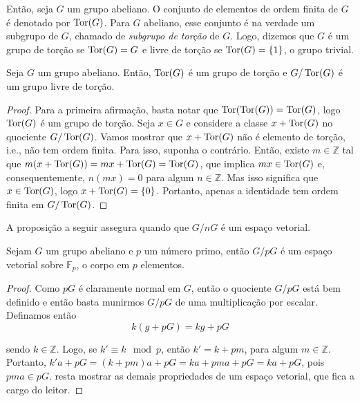 	\par\vspace{0.3cm} Então, seja $G$ um grupo abeliano. O conjunto de elementos de ordem finita de $G$ é denotado por $\operatorname{Tor}(G)$. Para $G$ abeliano, esse conjunto é na verdade um subgrupo de $G$, chamado de \textit{subgrupo de torção} de $G$. Logo, dizemos que $G$ é um grupo de torção se $\operatorname{Tor}(G) = G$ e livre de torção se $\operatorname{Tor}(G) = \left\{1\right\}$, o grupo trivial.
	\begin{lemma}
		\label{quociente por tor}
		Seja $G$ um grupo abeliano. Então, $\operatorname{Tor}(G)$ é um grupo de torção e $G/\operatorname{Tor}(G)$ é um grupo livre de torção.
	\end{lemma}
	\begin{proof}
		Para a primeira afirmação, basta notar que $\operatorname{Tor}(\operatorname{Tor}(G)) = \operatorname{Tor}(G)$, logo $\operatorname{Tor}(G)$ é um grupo de torção. Seja $x\in G$ e considere a classe $x + \operatorname{Tor}(G)$ no quociente $G/\operatorname{Tor}(G)$. Vamos mostrar que $x + \operatorname{Tor}(G)$ não é elemento de torção, i.e., não tem ordem finita. Para isso, suponha o contrário. Então, existe $m\in\mathbb{Z}$ tal que $m( x+\operatorname{Tor}(G) ) = mx + \operatorname{Tor}(G) = \operatorname{Tor}(G)$, que implica $mx\in\operatorname{Tor}(G)$ e, consequentemente, $n(mx) = 0$ para algum $n\in\mathbb{Z}$. Mas isso significa que $x\in\operatorname{Tor}(G)$, logo $x+\operatorname{Tor}(G) = \left\{0\right\}$. Portanto, apenas a identidade tem ordem finita em $G/\operatorname{Tor}(G)$. 
	\end{proof}
	\par\vspace{0.3cm} A proposição a seguir assegura quando que $G/nG$ é um espaço vetorial.
	\begin{prop}
		\label{G/nG espaco vetorial}
		Sejam $G$ um grupo abeliano e $p$ um número primo, então $G/pG$ é um espaço vetorial sobre $\mathbb{F}_p$, o corpo em $p$ elementos.
	\end{prop}
	\begin{proof}
		Como $pG$ é claramente normal em $G$, então o quociente $G/pG$ está bem definido e então basta munirmos $G/pG$ de uma multiplicação por escalar. Definamos então
		\begin{equation*}
		k(g+pG)  = kg + pG
		\end{equation*}
		\par\vspace{0.3cm} sendo $k\in\mathbb{Z}$. Logo, se $k'\equiv k\mod p$, então $k' = k + pm$, para algum $m\in\mathbb{Z}$. Portanto, $k'a + pG = (k+pm)a + pG = ka + pma + pG = ka + pG$, pois $pma\in pG$. resta mostrar as demais propriedades de um espaço vetorial, que fica a cargo do leitor.
	\end{proof}
	
